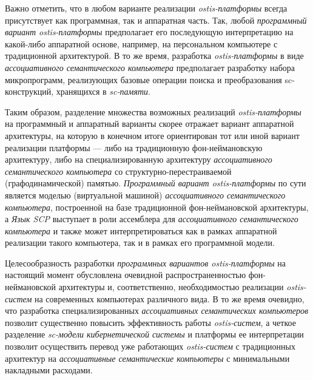 Важно отметить, что в любом варианте реализации \textit{ostis-платформы} всегда присутствует как программная, так и аппаратная часть. Так, любой \textit{программный вариант ostis-платформы} предполагает его последующую интерпретацию на какой-либо аппаратной основе, например, на персональном компьютере с традиционной архитектурой. В то же время, разработка \textit{ostis-платформы} в виде \textit{ассоциативного семантического компьютера} предполагает разработку набора микропрограмм, реализующих базовые операции поиска и преобразования sc-конструкций, хранящихся в \textit{sc-памяти}. 

Таким образом, разделение множества возможных реализаций \textit{ostis-платформы} на программный и аппаратный варианты скорее отражает вариант аппаратной архитектуры, на которую в конечном итоге ориентирован тот или иной вариант реализации платформы --- либо на традиционную фон-неймановскую архитектуру, либо на специализированную архитектуру \textit{ассоциативного семантического компьютера} со структурно-перестраиваемой (графодинамической) памятью. \textit{Программный вариант ostis-платформы} по сути является моделью (виртуальной машиной) \textit{ассоциативного семантического компьютера}, построенной на базе традиционной фон-неймановской архитектуры, а \textit{Язык SCP} выступает в роли ассемблера для \textit{ассоциативного семантического компьютера} и также может интерпретироваться как в рамках аппаратной реализации такого компьютера, так и в рамках его программной модели. 

Целесообразность разработки \textit{программных вариантов ostis-платформы} на настоящий момент обусловлена очевидной распространенностью фон-неймановской архитектуры и, соответственно, необходимостью реализации \textit{ostis-систем} на современных компьютерах различного вида. В то же время очевидно, что разработка специализированных \textit{ассоциативных семантических компьютеров} позволит существенно повысить эффективность работы \textit{ostis-систем}, а четкое разделение \textit{sc-модели кибернетической системы} и платформы ее интерпретации позволит осуществить перевод уже работающих \textit{ostis-систем} с традиционных архитектур на \textit{ассоциативные семантические компьютеры} с минимальными накладными расходами.

